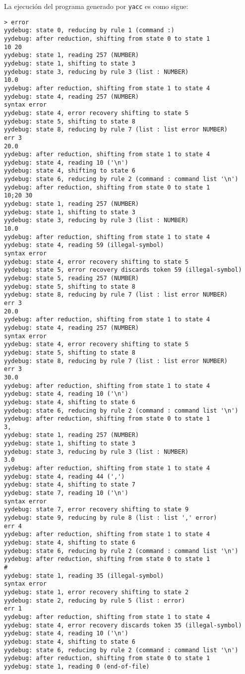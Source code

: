 \begin{execution}
La ejecución del programa generado por {\tt yacc} es como sigue:
\begin{verbatim}
> error
yydebug: state 0, reducing by rule 1 (command :)
yydebug: after reduction, shifting from state 0 to state 1
10 20
yydebug: state 1, reading 257 (NUMBER)
yydebug: state 1, shifting to state 3
yydebug: state 3, reducing by rule 3 (list : NUMBER)
10.0
yydebug: after reduction, shifting from state 1 to state 4
yydebug: state 4, reading 257 (NUMBER)
syntax error
yydebug: state 4, error recovery shifting to state 5
yydebug: state 5, shifting to state 8
yydebug: state 8, reducing by rule 7 (list : list error NUMBER)
err 3
20.0
yydebug: after reduction, shifting from state 1 to state 4
yydebug: state 4, reading 10 ('\n')
yydebug: state 4, shifting to state 6
yydebug: state 6, reducing by rule 2 (command : command list '\n')
yydebug: after reduction, shifting from state 0 to state 1
10;20 30
yydebug: state 1, reading 257 (NUMBER)
yydebug: state 1, shifting to state 3
yydebug: state 3, reducing by rule 3 (list : NUMBER)
10.0
yydebug: after reduction, shifting from state 1 to state 4
yydebug: state 4, reading 59 (illegal-symbol)
syntax error
yydebug: state 4, error recovery shifting to state 5
yydebug: state 5, error recovery discards token 59 (illegal-symbol)
yydebug: state 5, reading 257 (NUMBER)
yydebug: state 5, shifting to state 8
yydebug: state 8, reducing by rule 7 (list : list error NUMBER)
err 3
20.0
yydebug: after reduction, shifting from state 1 to state 4
yydebug: state 4, reading 257 (NUMBER)
syntax error
yydebug: state 4, error recovery shifting to state 5
yydebug: state 5, shifting to state 8
yydebug: state 8, reducing by rule 7 (list : list error NUMBER)
err 3
30.0
yydebug: after reduction, shifting from state 1 to state 4
yydebug: state 4, reading 10 ('\n')
yydebug: state 4, shifting to state 6
yydebug: state 6, reducing by rule 2 (command : command list '\n')
yydebug: after reduction, shifting from state 0 to state 1
3,
yydebug: state 1, reading 257 (NUMBER)
yydebug: state 1, shifting to state 3
yydebug: state 3, reducing by rule 3 (list : NUMBER)
3.0
yydebug: after reduction, shifting from state 1 to state 4
yydebug: state 4, reading 44 (',')
yydebug: state 4, shifting to state 7
yydebug: state 7, reading 10 ('\n')
syntax error
yydebug: state 7, error recovery shifting to state 9
yydebug: state 9, reducing by rule 8 (list : list ',' error)
err 4
yydebug: after reduction, shifting from state 1 to state 4
yydebug: state 4, shifting to state 6
yydebug: state 6, reducing by rule 2 (command : command list '\n')
yydebug: after reduction, shifting from state 0 to state 1
#
yydebug: state 1, reading 35 (illegal-symbol)
syntax error
yydebug: state 1, error recovery shifting to state 2
yydebug: state 2, reducing by rule 5 (list : error)
err 1
yydebug: after reduction, shifting from state 1 to state 4
yydebug: state 4, error recovery discards token 35 (illegal-symbol)
yydebug: state 4, reading 10 ('\n')
yydebug: state 4, shifting to state 6
yydebug: state 6, reducing by rule 2 (command : command list '\n')
yydebug: after reduction, shifting from state 0 to state 1
yydebug: state 1, reading 0 (end-of-file)
\end{verbatim}
\end{execution}


